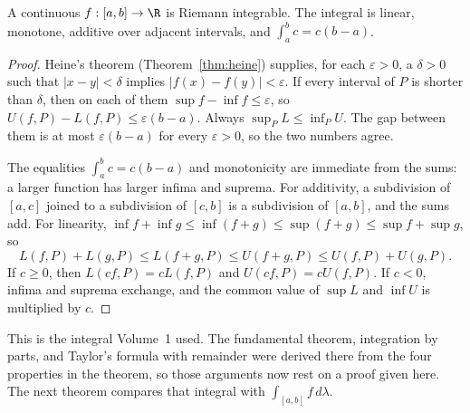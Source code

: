 \begin{theorem}\label{thm:riemanncont}
A continuous \(f:[a,b]\to\R\) is Riemann integrable. The integral is linear, monotone, additive over adjacent intervals, and \(\int_a^bc=c(b-a)\).
\end{theorem}
\begin{proof}
Heine's theorem (Theorem~\ref{thm:heine}) supplies, for each \(\varepsilon>0\), a \(\delta>0\) such that \(|x-y|<\delta\) implies \(|f(x)-f(y)|<\varepsilon\). If every interval of \(P\) is shorter than \(\delta\), then on each of them \(\sup f-\inf f\le\varepsilon\), so \(U(f,P)-L(f,P)\le\varepsilon(b-a)\). Always \(\sup_PL\le\inf_PU\). The gap between them is at most \(\varepsilon(b-a)\) for every \(\varepsilon>0\), so the two numbers agree.

The equalities \(\int_a^bc=c(b-a)\) and monotonicity are immediate from the sums: a larger function has larger infima and suprema. For additivity, a subdivision of \([a,c]\) joined to a subdivision of \([c,b]\) is a subdivision of \([a,b]\), and the sums add. For linearity, \(\inf f+\inf g\le\inf(f+g)\le\sup(f+g)\le\sup f+\sup g\), so
\[
L(f,P)+L(g,P)\le L(f+g,P)\le U(f+g,P)\le U(f,P)+U(g,P).
\]
If \(c\ge0\), then \(L(cf,P)=cL(f,P)\) and \(U(cf,P)=cU(f,P)\). If \(c<0\), infima and suprema exchange, and the common value of \(\sup L\) and \(\inf U\) is multiplied by \(c\).
\end{proof}

This is the integral Volume~1 used. The fundamental theorem, integration by parts, and Taylor's formula with remainder were derived there from the four properties in the theorem, so those arguments now rest on a proof given here. The next theorem compares that integral with \(\int_{[a,b]}f\,d\lambda\).

